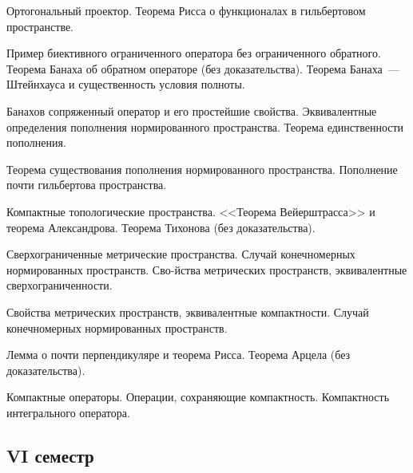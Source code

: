 \documentclass[a4paper]{article}
\begin{document}
\begin{nums}{-3}
\item Ортогональный проектор. Теорема Рисса о функционалах в гильбертовом пространстве.
\item Пример биективного ограниченного оператора без ограниченного обратного. Теорема Банаха об обратном
операторе (без доказательства). Теорема Банаха~--- Штейнхауса и существенность условия полноты.
\item Банахов сопряженный оператор и его простейшие свойства. Эквивалентные определения пополнения
нормированного пространства. Теорема единственности пополнения.
\item Теорема существования пополнения нормированного пространства. Пополнение почти гильбертова пространства.
\item Компактные топологические пространства. <<Теорема Вейерштрасса>> и теорема Александрова. Теорема Тихонова (без доказательства).
\item Сверхограниченные метрические пространства. Случай конечномерных нормированных пространств. Сво-\break йства
метрических пространств, эквивалентные сверхограниченности.
\item Свойства метрических пространств, эквивалентные компактности. Случай конечномерных нормированных пространств.
\item Лемма о почти перпендикуляре и теорема Рисса. Теорема Арцела (без доказательства).
\item Компактные операторы. Операции, сохраняющие компактность. Компактность интегрального оператора.
\end{nums}

\subsection*{VI семестр}
\end{document}
